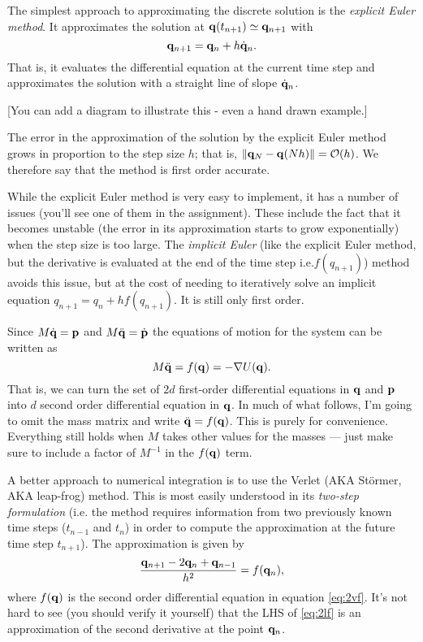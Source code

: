 The simplest approach to approximating the discrete solution is the \emph{explicit Euler method}. It approximates the solution at ${\bf q}(t_{n+1})\simeq {\bf q}_{n+1}$ with
$$
	{\bf q}_{n+1} = {\bf q}_n + h \dot{\bf q}_n.
$$
That is, it evaluates the differential equation at the current time step and approximates the solution with a straight line of slope $\dot{\bf q}_n$. 

[You can add a diagram to illustrate this - even a hand drawn example.]

The error in the approximation of the solution by the explicit Euler method grows in proportion to the step size $h$; that is, $\|{\bf q}_N-{\bf q}(Nh)\|=\mathcal{O}(h)$. We therefore say that the method is first order accurate.

While the explicit Euler method is very easy to implement, it has a number of issues (you'll see one of them in the assignment). These include the fact that it becomes unstable (the error in its approximation starts to grow exponentially) when the step size is too large. The \emph{implicit Euler} (like the explicit Euler method, but the derivative is evaluated at the end of the time step i.e.$f(q_{n+1})$) method avoids this issue, but at the cost of needing to iteratively solve an implicit equation $q_{n+1}=q_n+hf(q_{n+1})$. It is still only first order.

Since $M\dot{\bf q} = {\bf p}$ and $M\ddot{\bf q} = \dot{\bf p}$ the equations of motion for the system can be written as
\begin{equation}
	M\ddot{\bf q} = f({\bf q}) = -\nabla U({\bf q}).
	\label{eq:2vf}
\end{equation}
That is, we can turn the set of $2d$ first-order differential equations in ${\bf q}$ and ${\bf p}$ into $d$ second order differential equation in ${\bf q}$.
In much of what follows, I'm going to omit the mass matrix and write $\ddot{\bf q} = f({\bf q})$. This is purely for convenience. Everything still holds when $M$ takes other values for the masses --- just make sure to include a factor of $M^{-1}$ in the $f({\bf q})$ term.

A better approach to numerical integration is to use the Verlet (AKA St\"{o}rmer, AKA leap-frog) method. This is most easily understood in its \emph{two-step formulation} (i.e. the method requires information from two previously known time steps ($t_{n-1}$ and $t_n$) in order to compute the approximation at the future time step $t_{n+1}$). The approximation is given by 
\begin{equation}
	\frac{{\bf q}_{n+1} - 2{\bf q}_n + {\bf q}_{n-1}}{h^2} = f({\bf q}_n),
	\label{eq:2lf}
\end{equation}
where $f({\bf q})$ is the second order differential equation in equation \ref{eq:2vf}. It's not hard to see (you should verify it yourself) that the LHS of \ref{eq:2lf} is an approximation of the second derivative at the point ${\bf q}_n$.

